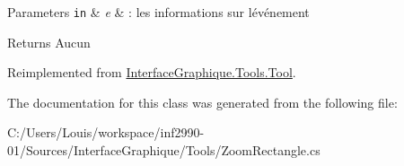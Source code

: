 \begin{DoxyParams}[1]{Parameters}
\mbox{\tt in}  & {\em e} & \+: les informations sur l\textquotesingle{}événement\\
\hline
\end{DoxyParams}
\begin{DoxyReturn}{Returns}
Aucun 
\end{DoxyReturn}


Reimplemented from \hyperlink{class_interface_graphique_1_1_tools_1_1_tool_a51c4828f7d24c599b5748b9b3f64d39e}{Interface\+Graphique.\+Tools.\+Tool}.



The documentation for this class was generated from the following file\+:\begin{DoxyCompactItemize}
\item 
C\+:/\+Users/\+Louis/workspace/inf2990-\/01/\+Sources/\+Interface\+Graphique/\+Tools/Zoom\+Rectangle.\+cs\end{DoxyCompactItemize}
